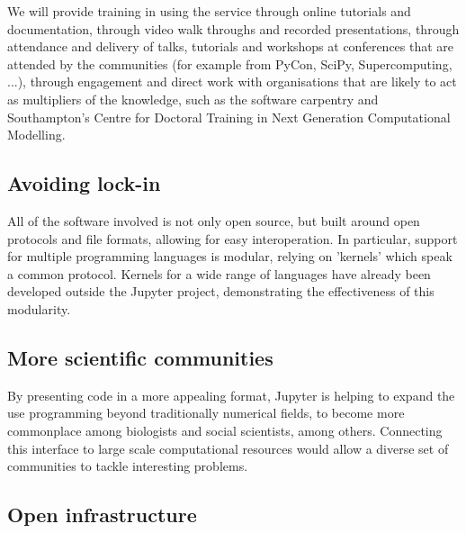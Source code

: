 
We will provide training in using the service through online tutorials
and documentation, through video walk throughs and recorded
presentations, through attendance and delivery of talks, tutorials and
workshops at conferences that are attended by the communities (for
example from PyCon, SciPy, Supercomputing, ...), through engagement
and direct work with organisations that are likely to act as
multipliers of the knowledge, such as the software carpentry and
Southampton's Centre for Doctoral Training in Next Generation
Computational Modelling.



\subsection{Avoiding lock-in}

All of the software involved is not only open source, but built around open
protocols and file formats, allowing for easy interoperation. In particular,
support for multiple programming languages is modular, relying on 'kernels'
which speak a common protocol. Kernels for a wide range of languages have
already been developed outside the Jupyter project, demonstrating the
effectiveness of this modularity.


\subsection{More scientific communities}

By presenting code in a more appealing format, Jupyter is helping to expand
the use programming beyond traditionally numerical fields, to become more
commonplace among biologists and social scientists, among others. Connecting
this interface to large scale computational resources would allow a diverse set
of communities to tackle interesting problems.


\subsection{Open infrastructure}

